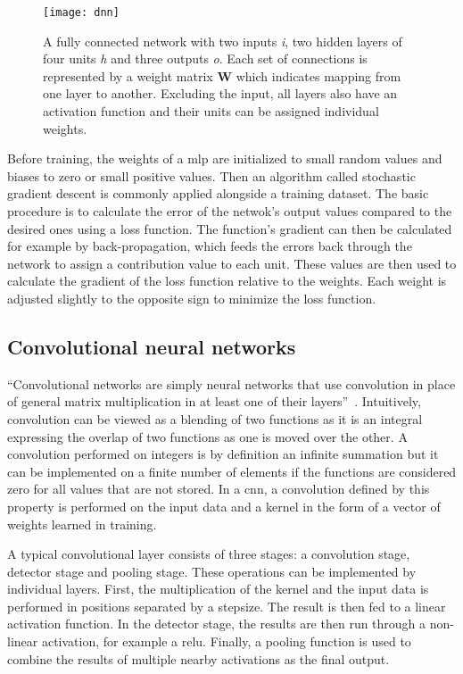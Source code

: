 \begin{figure}[H]
\centering
\texttt{[image: dnn]}
\caption{A fully connected network with two inputs \textit{i}, two hidden layers of
         four units \textit{h} and three outputs \textit{o}. Each set of connections
         is represented by a weight matrix \textbf{W} which indicates mapping from one
         layer to another. Excluding the input, all layers also have an activation
         function and their units can be assigned individual weights.}\label{fig:fcon}
\end{figure}

Before training, the weights of a \ac{mlp} are initialized to small random values and 
biases to zero or small positive values. Then an algorithm called stochastic
gradient descent is commonly applied alongside a training dataset. The basic procedure
is to calculate the error of the netwok's output values compared to the desired ones 
using a loss function. The function's gradient can then be calculated for
example by back-propagation, which feeds the errors back through the network
to assign a contribution value to each unit. These values are then used to calculate
the gradient of the loss function relative to the weights. Each weight is adjusted
slightly to the opposite sign to minimize the loss function.

\subsection{Convolutional neural networks}\label{ssec:dlcnn}

``Convolutional networks are simply neural networks that use convolution in place of
general matrix multiplication in at least one of their layers''~\cite{DEEP_LEARNING}.
Intuitively, convolution can be viewed as a blending of two functions as it is an
integral expressing the overlap of two functions as one is moved over the other.
A convolution performed on integers is by definition an infinite summation but it
can be implemented on a finite number of elements if the functions are considered
zero for all values that are not stored. In a \ac{cnn}, a convolution defined by this
property is performed on the input data and a kernel in the form of a vector of weights
learned in training.

A typical convolutional layer consists of three stages: a convolution stage, detector
stage and pooling stage. These operations can be implemented by individual layers. First,
the multiplication of the kernel and the input data is performed in positions separated by
a stepsize. The result is then fed to a linear activation function. In the detector stage,
the results are then run through a non-linear activation, for example a \ac{relu}. Finally,
a pooling function is used to combine the results of multiple nearby activations
as the final output.

